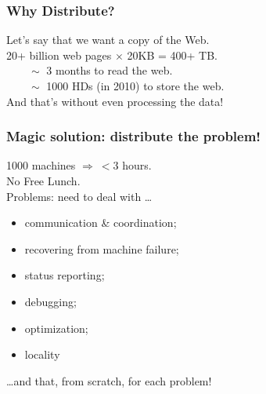 \documentclass[aspectratio=43]{beamer}
\newenvironment{changemargin}[1]{%
  \begin{list}{}{%
    \setlength{\topsep}{0pt}%
    \setlength{\leftmargin}{#1}%
    \setlength{\rightmargin}{1em}
    \setlength{\listparindent}{\parindent}%
    \setlength{\itemindent}{\parindent}%
    \setlength{\parsep}{\parskip}%
  }%
  \item[]}{\end{list}}
\begin{document}
\begin{frame}
  \frametitle{Why Distribute?}

  \begin{changemargin}{2cm}
    Let's say that we want a copy of the Web.\\[1em]

    20+ billion web pages $\times$ 20KB = 400+ TB.\\
    $\qquad \sim$ 3 months to read the web.\\
    $\qquad \sim$ 1000 HDs (in 2010) to store the web.\\[1em]

    And that's without even processing the data!

  \end{changemargin}
\end{frame}

\begin{frame}
  \frametitle{Magic solution: distribute the problem!}

  \begin{changemargin}{2cm}
    1000 machines $\Rightarrow ~< 3$ hours.\\[1em]

    No Free Lunch.\\
    Problems: need to deal with \ldots \\
\begin{itemize}
  \item communication \& coordination;
  \item recovering from machine failure;
  \item status reporting;
  \item debugging;
  \item optimization;
  \item locality
\end{itemize}

   \ldots and that, from scratch, for each problem!
  \end{changemargin}
\end{frame}
\end{document}
